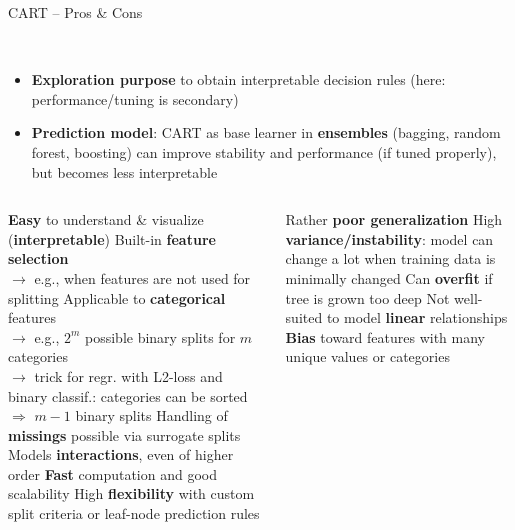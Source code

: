 \begin{frame}{CART -- Pros \& Cons}

 ~~ 
\begin{itemize}
    \item \textbf{Exploration purpose} to obtain interpretable decision rules (here: performance/tuning is secondary)
    \item \textbf{Prediction model}: CART as base learner in \textbf{ensembles} (bagging, random forest, boosting) can improve stability and performance (if tuned properly), but becomes less interpretable
\end{itemize}

\medskip
\begin{columns}[onlytextwidth]
  \begin{column}{0.5\textwidth}
    \footnotesize
    \begin{itemize}
      \positem \textbf{Easy} to understand \& visualize (\textbf{interpretable})
      \positem Built-in \textbf{feature selection}\\
      $\rightarrow$ e.g., when features are not used for splitting
      \positem Applicable to \textbf{categorical} features \\
      $\rightarrow$ e.g., $2^m$ possible binary splits for $m$ categories\\
       $\rightarrow$ trick for regr. with L2-loss and binary classif.: categories can be sorted $\Rightarrow$ $m-1$ binary splits 
      \positem Handling of \textbf{missings} possible via surrogate splits
      \positem Models  \textbf{interactions}, 
      even of higher order
      \positem \textbf{Fast} computation and good scalability
      \positem High \textbf{flexibility} with custom split criteria or leaf-node 
      prediction rules
    \end{itemize}
  \end{column}
  \begin{column}{0.5\textwidth}
    \footnotesize
    \begin{itemize}
      \negitem Rather \textbf{poor generalization} %
      \negitem High \textbf{variance/instability}: model can change a lot when training data is minimally changed
      \negitem Can \textbf{overfit} if tree is grown too deep
      \negitem Not well-suited to model \textbf{linear} relationships
      \negitem \textbf{Bias} toward features with many unique values or categories
    \end{itemize}
  \end{column}
\end{columns}

\end{frame}

